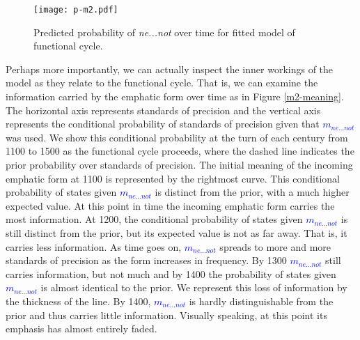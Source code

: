 \documentclass[linguex]{sp}
\theoremstyle{definition} \newtheorem{definition}{Definition}
\begin{document}
\begin{figure}
\centering
     \texttt{[image: p-m2.pdf]}
\caption{Predicted probability of \textit{\color{blue} ne...not} over time for fitted model of functional cycle.}
\label{m2-sol}
\end{figure}

Perhaps more importantly, we can actually inspect the inner workings of the model as they relate to the functional cycle. That is, we can examine the information carried by the emphatic form over time as in Figure \ref{m2-meaning}. The horizontal axis represents standards of precision and the vertical axis represents the conditional probability of standards of precision given that \emph{\textcolor{blue}{$m_{ne...not}$}} was used. We show this conditional probability at the turn of each century from 1100 to 1500 as the functional cycle proceeds, where the dashed line indicates the prior probability over standards of precision.  The initial meaning of the incoming emphatic form at 1100 is represented by the rightmost curve. This conditional probability of states given \emph{\textcolor{blue}{$m_{ne...not}$}} is distinct from the prior, with a much higher expected value. At this point in time the incoming emphatic form carries the most information. At 1200, the conditional probability of states given \emph{\textcolor{blue}{$m_{ne...not}$}} is still distinct from the prior, but its expected value is not as far away. That is, it carries less information. As time goes on, \emph{\textcolor{blue}{$m_{ne...not}$}}  spreads to more and more standards of precision as the form increases in frequency. By 1300 \emph{\textcolor{blue}{$m_{ne...not}$}} still carries information, but not much and by 1400 the probability of states given \emph{\textcolor{blue}{$m_{ne...not}$}} is almost identical to the prior. We represent this loss of information by the thickness of the line. By 1400, \emph{\textcolor{blue}{$m_{ne...not}$}} is hardly distinguishable from the prior and thus carries little information. Visually speaking, at this point its emphasis has almost entirely faded.

\end{document}
